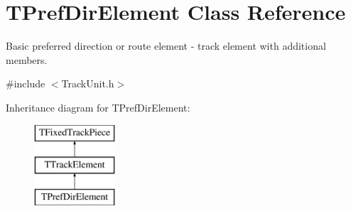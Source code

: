 \hypertarget{class_t_pref_dir_element}{}\section{T\+Pref\+Dir\+Element Class Reference}
\label{class_t_pref_dir_element}


Basic preferred direction or route element -\/ track element with additional members.  




{\ttfamily \#include $<$Track\+Unit.\+h$>$}

Inheritance diagram for T\+Pref\+Dir\+Element\+:\begin{figure}[H]
\begin{center}
\leavevmode
\includegraphics[height=3.000000cm]{class_t_pref_dir_element}
\end{center}
\end{figure}
